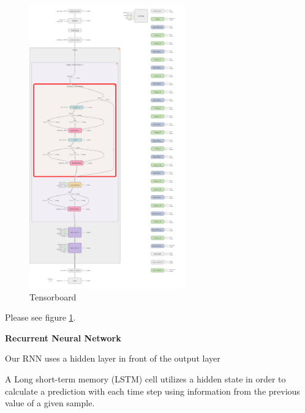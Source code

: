 \documentclass{article}
\begin{document}
\begin{enumerate}
\begin{enumerate}
		\begin{item}
			\begin{figure}[p]
				\centering
				\includegraphics[width=0.6\textwidth]{figures/cifar_4_Extended}
				\caption{Tensorboard}
				\label{fig:tensorboard}
			\end{figure}
			Please see  figure \ref{fig:tensorboard}. 

		\end{item}
		
		
	\end{enumerate}




	
	\begin{item}
		\textbf{Recurrent Neural Network}
	\end{item}
	\begin{enumerate}
		\begin{item}
			Our RNN uses a hidden layer in front of the output layer 
		\end{item}
			\begin{item}
			A Long short-term memory (LSTM) cell utilizes a hidden state in order to calculate a prediction with each time step using information from the previous value of a given sample.
			

\end{item}
\end{enumerate}
\end{enumerate}
\end{document}
